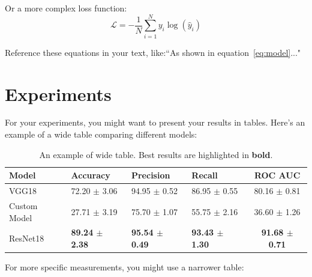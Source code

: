 \documentclass[11pt]{article}
\begin{document}
\begin{multicols}{2}
        \noindent Or a more complex loss function:
        \begin{equation}
            \label{eq:loss}
            \mathcal{L} = -\frac{1}{N}\sum_{i=1}^{N} y_i\log(\hat{y}_i)
        \end{equation}

        \noindent Reference these equations in your text, like:``As shown in equation~\ref{eq:model}..."

        \section{Experiments}
        For your experiments, you might want to present your results in tables. Here's an example of a wide table comparing different models:

        \begin{table}[t]
            \centering
            \setlength{\tabcolsep}{3pt}
            \caption{An example of wide table. Best results are highlighted in \textbf{bold}.}
            \begin{tabularx}{\textwidth}{lYYYc}
                \toprule
                Model & Accuracy & Precision & Recall & ROC AUC\\
                \midrule
                VGG18         &  72.20 $\pm$ 3.06    &   94.95 $\pm$ 0.52     &   86.95 $\pm$ 0.55    &   80.16 $\pm$ 0.81\\
                Custom Model        &  27.71 $\pm$ 3.19    &   75.70 $\pm$ 1.07     &   55.75 $\pm$ 2.16    &   36.60 $\pm$ 1.26\\
                ResNet18    &  \textbf{89.24 $\pm$ 2.38}    &   \textbf{95.54 $\pm$ 0.49}     &   \textbf{93.43 $\pm$ 1.30}    &   \textbf{91.68 $\pm$ 0.71}\\
                \bottomrule
            \end{tabularx}
            \label{tab:Performance}
        \end{table}

        \noindent For more specific measurements, you might use a narrower table:
    

\end{multicols}
\end{document}
